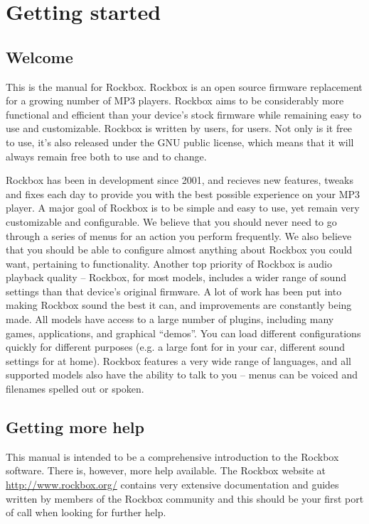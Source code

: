 \chapter{Getting started}
\section{Welcome}
This is the manual for Rockbox. Rockbox is an open source firmware replacement
for a growing number of MP3 players. Rockbox aims to be considerably more
functional and efficient than your device's stock firmware while remaining easy
to use and customizable. Rockbox is written by users, for users. Not only is it
free to use, it's also released under the GNU public license, which means that
it will always remain free both to use and to change.

Rockbox has been in development since 2001, and recieves new features, tweaks
and fixes each day to provide you with the best possible experience on your MP3
player. A major goal of Rockbox is to be simple and easy to use, yet remain very
customizable and configurable. We believe that you should never need to go
through a series of menus for an action you perform frequently. We also believe
that you should be able to configure almost anything about Rockbox you could
want, pertaining to functionality. Another top priority of Rockbox is audio
playback quality -- Rockbox, for most models, includes a wider range of sound
settings than that device's original firmware. A lot of work has been put into
making Rockbox sound the best it can, and improvements are constantly being made.
All models have access to a large number of plugins, including many games,
applications, and graphical ``demos''. You can load different configurations
quickly for different purposes (e.g. a large font for in your car, different
sound settings for at home). Rockbox features a very wide range of languages, and
all supported models also have the ability to talk to you -- menus can be voiced
and filenames spelled out or spoken.

\section{Getting more help}
This manual is intended to be a comprehensive introduction to the Rockbox
software. There is, however, more help available.  The Rockbox website at
\url{http://www.rockbox.org/} contains very extensive documentation and guides
written by members of the Rockbox community and this should be your first port
of call when looking for further help.

